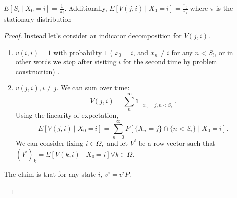 \documentclass[a4paper]{article}
\begin{document}
\begin{corollary}
  $E[S_i \mid X_0 =i] = \frac{1}{\pi_i}$. Additionally, $E[V(j,i) \mid X_{0}=i] = \frac{\pi_j}{\pi_i}$ where $\pi$ is the stationary distribution

  \begin{proof}
    Instead let's consider an indicator decomposition for $V(j,i)$.
\begin{enumerate}
  \item $v(i,i) = 1$ with probability  $1$ ( $x_0=i$, and $x_n \neq i$ for any  $n < S_i$, or in other words we stop after visiting $i$ for the second time by problem construction) .  
  \item $v(j,i), i \neq j$. We can sum over time:
     \[
       V(j,i) = \sum_{n}^{\infty} \mathbb{1}\mid_{x_n = j, n < S_i}
    .\] 
    Using the linearity of expectation,
    \[
      E[V(j,i) \mid X_0 = i] = \sum_{n=0}^{\infty} P[\{X_n =j\} \cap \{n < S_i\} \mid X_0=i]  
    .\] 
    We can consider fixing $i \in \Omega, $ and let  $V^{i}$ be a row vector such that $(V^{i})_{k} = E[V(k,i) \mid  X_0 =i] \forall k \in \Omega$.
    \end{enumerate}

    \begin{prop}
       The claim is that for any state $i$, $v^{i} = v^{i} P$.


\end{prop}
\end{proof}
\end{corollary}
\end{document}
